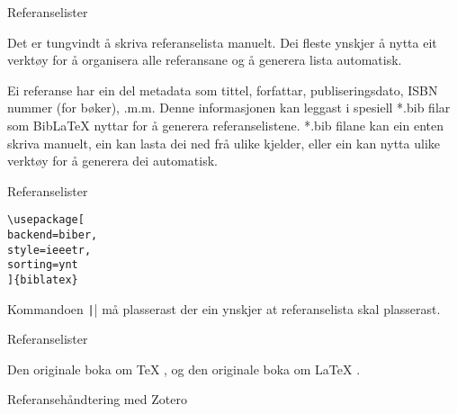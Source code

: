 \begin{frame}[containsverbatim]{Referanselister}
	
	Det er tungvindt å skriva referanselista manuelt. Dei fleste ynskjer å nytta eit verktøy for å organisera alle referansane og å generera lista automatisk.
	
	Ei referanse har ein del metadata som tittel, forfattar, publiseringsdato, ISBN nummer (for bøker), .m.m. Denne informasjonen kan leggast i spesiell *.bib filar som BibLaTeX nyttar for å generera referanselistene. *.bib filane kan ein enten skriva manuelt, ein kan lasta dei ned frå ulike kjelder, eller ein kan nytta ulike verktøy for å generera dei automatisk.	
	

	
\end{frame}


\begin{frame}[containsverbatim]{Referanselister}
	
	\begin{verbatim}
\usepackage[
backend=biber,
style=ieeetr,
sorting=ynt
]{biblatex}

	\end{verbatim}

Kommandoen \texttt|\printbibliography| må plasserast der ein ynskjer at referanselista skal plasserast.

\end{frame}


\begin{frame}[containsverbatim]{Referanselister}

Den originale boka om \TeX{} \cite{knuth1986texbook}, og den originale boka om \LaTeX{} \cite{lamport1994latex}.
	
\printbibliography

\end{frame}


\begin{frame}{Referansehåndtering med Zotero}
	
	
\end{frame}